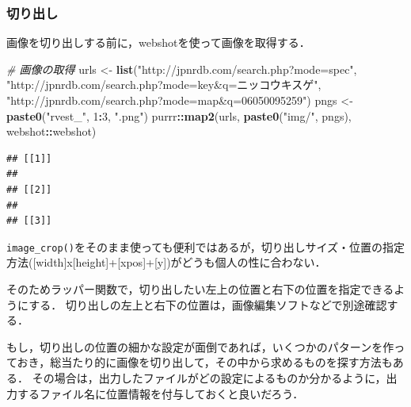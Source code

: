 \documentclass[
]{article}
\newenvironment{Shaded}{\begin{snugshade}}{\end{snugshade}}
\newcommand{\CommentTok}[1]{\textcolor[rgb]{0.56,0.35,0.01}{\textit{#1}}}
\newcommand{\DecValTok}[1]{\textcolor[rgb]{0.00,0.00,0.81}{#1}}
\newcommand{\FunctionTok}[1]{\textcolor[rgb]{0.13,0.29,0.53}{\textbf{#1}}}
\newcommand{\NormalTok}[1]{#1}
\newcommand{\OtherTok}[1]{\textcolor[rgb]{0.56,0.35,0.01}{#1}}
\newcommand{\SpecialCharTok}[1]{\textcolor[rgb]{0.81,0.36,0.00}{\textbf{#1}}}
\newcommand{\StringTok}[1]{\textcolor[rgb]{0.31,0.60,0.02}{#1}}
\begin{document}
\hypertarget{ux5207ux308aux51faux3057}{%
\subsubsection{切り出し}\label{ux5207ux308aux51faux3057}}

画像を切り出しする前に，webshotを使って画像を取得する．

\begin{Shaded}
\begin{Highlighting}[]
  \CommentTok{\# 画像の取得}
\NormalTok{urls }\OtherTok{\textless{}{-}} 
  \FunctionTok{list}\NormalTok{(}\StringTok{"http://jpnrdb.com/search.php?mode=spec"}\NormalTok{,}
       \StringTok{"http://jpnrdb.com/search.php?mode=key\&q=ニッコウキスゲ"}\NormalTok{,}
       \StringTok{"http://jpnrdb.com/search.php?mode=map\&q=06050095259"}\NormalTok{)}
\NormalTok{pngs }\OtherTok{\textless{}{-}} \FunctionTok{paste0}\NormalTok{(}\StringTok{"rvest\_"}\NormalTok{, }\DecValTok{1}\SpecialCharTok{:}\DecValTok{3}\NormalTok{, }\StringTok{".png"}\NormalTok{)}
\NormalTok{purrr}\SpecialCharTok{::}\FunctionTok{map2}\NormalTok{(urls, }\FunctionTok{paste0}\NormalTok{(}\StringTok{"img/"}\NormalTok{, pngs), webshot}\SpecialCharTok{::}\NormalTok{webshot)}
\end{Highlighting}
\end{Shaded}

\begin{verbatim}
## [[1]]
## 
## [[2]]
## 
## [[3]]
\end{verbatim}

\texttt{image\_crop()}をそのまま使っても便利ではあるが，切り出しサイズ・位置の指定方法({[}width{]}x{[}height{]}+{[}xpos{]}+{[}y{]})がどうも個人の性に合わない．

そのためラッパー関数で，切り出したい左上の位置と右下の位置を指定できるようにする．
切り出しの左上と右下の位置は，画像編集ソフトなどで別途確認する．

もし，切り出しの位置の細かな設定が面倒であれば，いくつかのパターンを作っておき，総当たり的に画像を切り出して，その中から求めるものを探す方法もある．
その場合は，出力したファイルがどの設定によるものか分かるように，出力するファイル名に位置情報を付与しておくと良いだろう．
\end{document}
